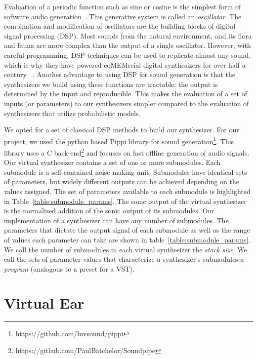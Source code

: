 \documentclass[runningheads,a4paper]{llncs}
\begin{document}
Evaluation of a periodic function such as sine or cosine is the simplest form of software audio generation~\cite{mitchell2009basicsynthChap5}. This generative system is called an \textit{oscillator}. The combination and modification of oscillators are the building blocks of digital signal processing (DSP). Most sounds from the natural environment, and its flora and fauna are more complex than the output of a single oscillator. However, with careful programming, DSP techniques can be used to replicate almost any sound, which is why they have powered coMEMrcial digital synthesizers for over half a century ~\cite{jenkins2019analog}. Another advantage to using DSP for sound generation is that the synthesizers we build using these functions are tractable: the output is determined by the input and reproducible. This makes the evaluation of a set of inputs (or parameters) to our synthesizers  simpler compared to the evaluation of synthesizers that utilize probabilistic models.
 
We opted for a set of classical DSP methods to build our synthesizer. For our project, we used the python based Pippi library for sound generation\footnote{https://github.com/luvsound/pippi}. This library uses a C back-end\footnote{https://github.com/PaulBatchelor/Soundpipe} and focuses on fast offline generation of audio signals. Our virtual synthesizer contains a set of one or more submodules. Each submodule is a self-contained noise making unit. Submodules have identical sets of parameters, but widely different outputs can be achieved depending on the values assigned. The set of parameters available to each submodule is highlighted in Table~\ref{table:submodule_params}. The sonic output of the virtual synthesizer is the normalized addition of the sonic output of its submodules. Our implementation of a synthesizer can have any number of submodules. The parameters that dictate the output signal of each submodule as well as the range of values each parameter can take are shown in table~\ref{table:submodule_params}. We call the number of submodules in each virtual synthesizer the \textit{stack size}. We call the sets of parameter values that characterize a synthesizer's submodules a \textit{program} (analogous to a preset for a VST).  

\section{Virtual Ear}
\end{document}
